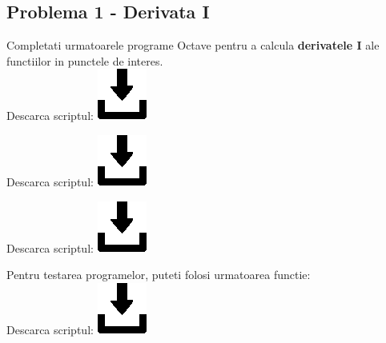 \documentclass{article}
\begin{document}
\lstset{style=mystyle}

\subsection{Problema 1 - Derivata I}
\tab Completati urmatoarele programe Octave pentru a calcula \textbf{derivatele I} ale functiilor in punctele de interes.\\
\tabto{0.5cm} Descarca scriptul:
\href{https://github.com/Iulian277/Numerical-Differentiation-and-Integration/blob/main/Derivare/Prima\%20derivata/TwoPoints.m}{\includegraphics[scale=0.35]{download_button}}

\tabto{0.5cm} Descarca scriptul:
\href{https://github.com/Iulian277/Numerical-Differentiation-and-Integration/blob/main/Derivare/Prima\%20derivata/ThreePoints_Mid.m}{\includegraphics[scale=0.35]{download_button}}

\tabto{0.5cm} Descarca scriptul:
\href{https://github.com/Iulian277/Numerical-Differentiation-and-Integration/blob/main/Derivare/Prima\%20derivata/ThreePoints_End.m}{\includegraphics[scale=0.35]{download_button}}


Pentru testarea programelor, puteti folosi urmatoarea functie:\\
\tabto{0.5cm} Descarca scriptul:
\href{https://github.com/Iulian277/Numerical-Differentiation-and-Integration/blob/main/Derivare/Prima\%20derivata/testare_derivate.m}{\includegraphics[scale=0.35]{download_button}}
 \vspace{0.5cm}
\end{document}
